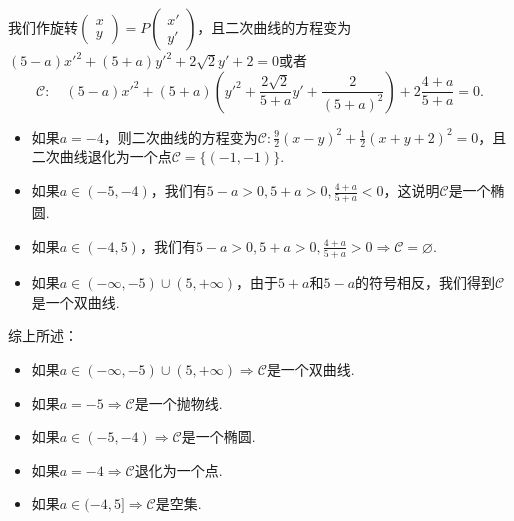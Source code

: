 \begin{solution}
  我们作旋转$\begin{pmatrix}
    x \\
    y
  \end{pmatrix}=P\begin{pmatrix}
    x' \\
    y'
  \end{pmatrix}$，且二次曲线的方程变为$(5-a)x'^2+(5+a)y'^2+2\sqrt2y'+2=0$或者
  \[
    \mathscr C:\quad (5 - a)x'^2 + (5 + a)\left( y'^2 + \frac{2\sqrt2}{5 + a}y' + \frac2{(5 + a)^2}\right) + 2\frac{4 + a}{5 + a} = 0.
  \]
  \begin{itemize}
    \item 如果$a=-4$，则二次曲线的方程变为$\mathscr C:\frac92(x-y)^2+\frac12(x+y+2)^2=0$，且二次曲线退化为一个点$\mathscr C=\{(-1,-1)\}$.
    \item 如果$a\in(-5,-4)$，我们有$5-a>0,5+a>0,\frac{4+a}{5+a}<0$，这说明$\mathscr C$是一个椭圆.
    \item 如果$a\in(-4,5)$，我们有$5-a>0,5+a>0,\frac{4+a}{5+a}>0\Rightarrow\mathscr C=\varnothing$.
    \item 如果$a\in(-\infty,-5)\cup(5,+\infty)$，由于$5+a$和$5-a$的符号相反，我们得到$\mathscr C$是一个双曲线.
  \end{itemize}

  综上所述：
  \begin{itemize}
    \item 如果$a\in(-\infty,-5)\cup(5,+\infty)\Rightarrow\mathscr C $是一个双曲线.
    \item 如果$a=-5\Rightarrow\mathscr C$是一个抛物线.
    \item 如果$a\in(-5,-4)\Rightarrow\mathscr C$是一个椭圆.
    \item 如果$a=-4\Rightarrow\mathscr C$退化为一个点.
    \item 如果$a\in(-4,5]\Rightarrow\mathscr C$是空集.
  \end{itemize}


\end{solution}
